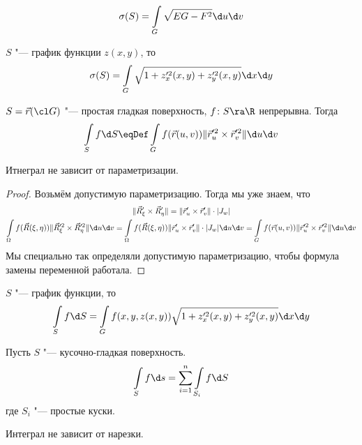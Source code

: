 \begin{conseq}
	\[
		\sigma(S) = \int\limits_G \sqrt{EG - F^2} \d u \d v
	\]
\end{conseq}

\begin{conseq}
	$S$ "--- график функции $z(x, y)$, то
	\[
		\sigma(S) = \int\limits_G \sqrt{1 + z_x'^2(x, y) + z_y'^2(x, y)} \d x \d y
	\]
\end{conseq}

\begin{Def}
	$S = \vec r(\cl G)$ "--- простая гладкая поверхность, $f\colon S \ra \R$ непрерывна.
	Тогда
	\[
		\int\limits_S f \d S \eqDef \int\limits_G f(\vec r(u, v)) \| \vec r_u'^2 \times \vec r_v'^2 \| \d u \d v
	\]
\end{Def}

\begin{theorem}
	Итнеграл не зависит от параметризации.
\end{theorem}
\begin{proof}
	Возьмём допустимую параметризацию. Тогда мы уже знаем, что
	\begin{gather*}
		\|\vec R_\xi' \times \vec R_\eta'\| = \|\vec r_u' \times \vec r_v'\| \cdot |J_w| \\
		\int\limits_\Omega f(\vec R(\xi, \eta)) \| \vec R_\xi'^2 \times \vec R_\eta'^2 \| \d u \d v
		= \int\limits_\Omega f(\vec R(\xi, \eta)) \|\vec r_u' \times \vec r_v'\| \cdot |J_w| \d u \d v
		= \int\limits_G f(\vec r(u, v)) \| \vec r_u'^2 \times \vec r_v'^2 \| \d u \d v
	\end{gather*}
	Мы специально так определяли допустимую параметризацию, чтобы формула замены переменной работала.
\end{proof}

\begin{Rem}
	$S$ "--- график функции, то
	\[ \int\limits_S f \d S = \int\limits_G f(x, y, z(x, y)) \sqrt{1 + z_x'^2(x, y) + z_y'^2(x, y)} \d x \d y \]
\end{Rem}

\begin{Def}
	Пусть $S$ "--- кусочно-гладкая поверхность.
	\[ \int\limits_S f \d s = \sum_{i=1}^n \int\limits_{S_i} f \d S \]
	где $S_i$ "--- простые куски.
\end{Def}

\begin{Rem}
	Интеграл не зависит от нарезки.
\end{Rem}
